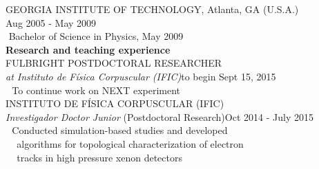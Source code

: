 \indent\hspace{0.2 cm}GEORGIA INSTITUTE OF TECHNOLOGY, Atlanta, GA (U.S.A.)\\
\indent\hspace{0.2 cm}Aug 2005 - May 2009\\

\indent\hspace{0.2 cm}\hspace{0.6 cm}\textbullet\,\,Bachelor of Science in Physics, May 2009\\ %

{\noindent\textbf{Research and teaching experience}}\\

\indent\hspace{0.2 cm}FULBRIGHT POSTDOCTORAL RESEARCHER\\
\indent\hspace{0.2 cm}\hspace{0.6 cm}\emph{at Instituto de F\'{i}sica Corpuscular (IFIC)}\hspace{4.6 cm}to begin Sept 15, 2015\\
\indent\hspace{0.2 cm}\hspace{0.6 cm}\hspace{0.6 cm}\textbullet\,\, To continue work on NEXT experiment\\

\indent\hspace{0.2 cm}INSTITUTO DE F\'{I}SICA CORPUSCULAR (IFIC)\\
\indent\hspace{0.2 cm}\hspace{0.6 cm}\emph{Investigador Doctor Junior} (Postdoctoral Research)\hspace{3.1 cm}Oct 2014 - July 2015\\
\indent\hspace{0.2 cm}\hspace{0.6 cm}\hspace{0.6 cm}\textbullet\,\, Conducted simulation-based studies and developed\\
\indent\hspace{0.2 cm}\hspace{0.6 cm}\hspace{0.6 cm}\,\,\,\,\,\,\,algorithms for topological characterization of electron\\
\indent\hspace{0.2 cm}\hspace{0.6 cm}\hspace{0.6 cm}\,\,\,\,\,\,\,tracks in high pressure xenon detectors\\

